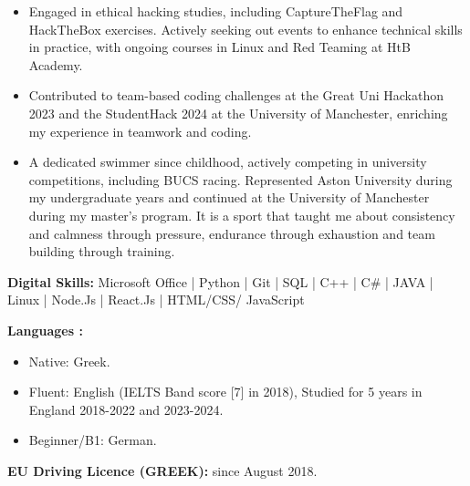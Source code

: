 \begin{itemize}

      \item Engaged in ethical hacking studies, including CaptureTheFlag and HackTheBox exercises. Actively seeking out events to enhance technical skills in practice, with ongoing courses in Linux and Red Teaming at HtB Academy.
      \item Contributed to team-based coding challenges at the Great Uni Hackathon 2023 and the StudentHack 2024 at the University of Manchester, enriching my experience in teamwork and coding.
      \item A dedicated swimmer since childhood, actively competing in university competitions, including BUCS racing. Represented Aston University during my undergraduate years and continued at the University of Manchester during my master's program. It is a sport that taught me about consistency and calmness through pressure, endurance through exhaustion and team building through training.

\end{itemize}

\vspace{10pt}

\textbf{Digital Skills:}
Microsoft Office | Python | Git | SQL | C++ | C\# | JAVA | Linux | Node.Js | React.Js | HTML/CSS/
JavaScript

\vspace{10pt}

\textbf{Languages :}
\begin{itemize}
      \item Native: Greek.
      \item Fluent: English (IELTS Band score [7] in 2018), Studied for 5 years in England 2018-2022 and 2023-2024.
      \item Beginner/B1: German.
\end{itemize}

\textbf{EU Driving Licence (GREEK):} since August 2018.
